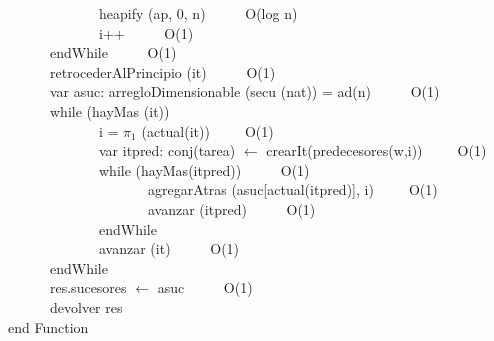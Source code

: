 \documentclass[a4paper,10pt]{article}
\begin{document}
\begin{algoritmo}
	\indent \ \ \ \ \ \ \ \ \ \ \ \ \ heapify (ap, 0, n) \ \ \ \ \ O(log n) \\
	\indent \ \ \ \ \ \ \ \ \ \ \ \ \ i++ \ \ \ \ \ O(1) \\
	\indent \ \ \ \ \ \  endWhile \ \ \ \ \ O(1)\\	
	\indent \ \ \ \ \ \  retrocederAlPrincipio (it) \ \ \ \ \ O(1)\\	
	\indent \ \ \ \ \ \  var asuc: arregloDimensionable (secu (nat)) = ad(n) \ \ \ \ \ O(1)\\	
	\indent \ \ \ \ \ \  while (hayMas (it))  \ \ \ \ \ \\
	\indent \ \ \ \ \ \ \ \ \ \ \ \ \ i = $\pi_1$ (actual(it))\ \ \ \ \ O(1) \\
	\indent \ \ \ \ \ \ \ \ \ \ \ \ \ var itpred: conj(tarea) $\gets$ crearIt(predecesores(w,i))\ \ \ \ \ O(1) \\
	\indent \ \ \ \ \ \ \ \ \ \ \ \ \ while (hayMas(itpred)) \ \ \ \ \ O(1) \\
	\indent \ \ \ \ \ \ \ \ \ \ \ \ \ \ \ \ \ \ \ \ agregarAtras (asuc[actual(itpred)], i)\ \ \ \ \ O(1) \\
	\indent \ \ \ \ \ \ \ \ \ \ \ \ \ \ \ \ \ \ \ \ avanzar (itpred) \ \ \ \ \ O(1) \\
	\indent \ \ \ \ \ \ \ \ \ \ \ \ \ endWhile \ \ \ \ \ \\
	\indent \ \ \ \ \ \ \ \ \ \ \ \ \ avanzar (it) \ \ \ \ \ O(1)\\
	\indent \ \ \ \ \ \ endWhile \ \ \ \ \ \\
	\indent \ \ \ \ \ \  res.sucesores $\gets$ asuc \ \ \ \ \ O(1)\\
	\indent \ \ \ \ \ \ devolver res    \\
   end Function \\


\end{algoritmo}
\end{document}
